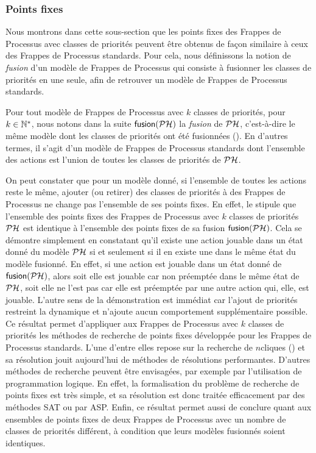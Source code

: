 \subsubsection{Points fixes}

Nous montrons dans cette sous-section que les points fixes des Frappes de Processus
avec classes de priorités peuvent être obtenus de façon similaire à ceux
des Frappes de Processus standards.
Pour cela, nous définissons la notion de \emph{fusion} d'un modèle de Frappes de Processus
qui consiste à fusionner les classes de priorités en une seule,
afin de retrouver un modèle de Frappes de Processus standards.

\myskip

Pour tout modèle de Frappes de Processus avec $k$ classes de priorités, pour $k \in \mathbb{N}^*$,
nous notons dans la suite $\mathsf{fusion}(\mathcal{PH})$
la \emph{fusion} de $\mathcal{PH}$,
c'est-à-dire le même modèle dont les classes de priorités ont été fusionnées
().
En d'autres termes, il s'agit d'un modèle de Frappes de Processus standards dont
l'ensemble des actions est l'union de toutes les classes de priorités de $\mathcal{PH}$.

On peut constater que pour un modèle donné, si l'ensemble de toutes les actions reste le même,
ajouter (ou retirer) des classes de priorités à des Frappes de Processus ne change pas
l'ensemble de ses points fixes.
En effet, le  stipule que
l'ensemble des points fixes des Frappes de Processus avec $k$
classes de priorités $\mathcal{PH}$ est identique à l'ensemble des points fixes de
sa fusion $\mathsf{fusion}(\mathcal{PH})$.
Cela se démontre simplement en constatant qu'il existe une action jouable dans un état donné du
modèle $\mathcal{PH}$ si et seulement si il en existe une dans le même état du modèle fusionné.
En effet, si une action est jouable dans un état donné de $\mathsf{fusion}(\mathcal{PH})$,
alors soit elle est jouable car non préemptée dans le même état de $\mathcal{PH}$,
soit elle ne l'est pas car elle est préemptée par une autre action qui, elle, est jouable.
L'autre sens de la démonstration est immédiat car l'ajout de priorités restreint la dynamique
et n'ajoute aucun comportement supplémentaire possible.
Ce résultat permet d'appliquer aux Frappes de Processus avec $k$ classes de priorités
les méthodes de recherche de points fixes développée pour les Frappes de Processus standards.
L'une d'entre elles repose sur la recherche de $n$\nbd cliques ()
et sa résolution jouit aujourd'hui de méthodes de résolutions performantes.
D'autres méthodes de recherche peuvent être envisagées,
par exemple par l'utilisation de programmation logique.
En effet, la formalisation du problème de recherche de points fixes est très simple,
et sa résolution est donc traitée efficacement par des méthodes SAT ou par ASP.
Enfin, ce résultat permet aussi de conclure quant aux ensembles de points fixes de deux Frappes
de Processus avec un nombre de classes de priorités différent, à condition que
leurs modèles fusionnés soient identiques.

